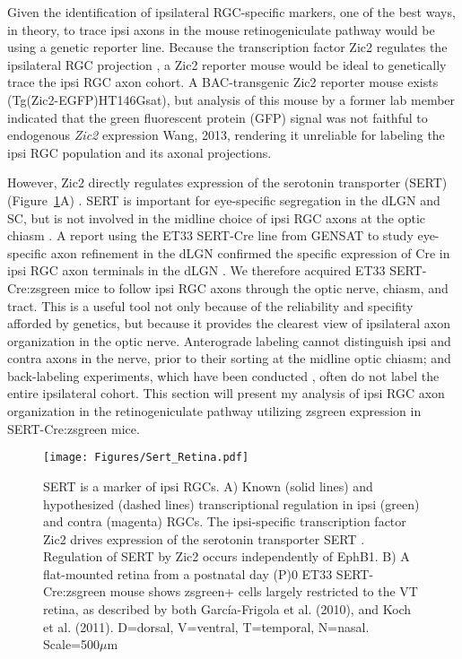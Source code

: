 \label{sec:SertCreResults}
Given the identification of ipsilateral RGC-specific markers, one of the best ways, in theory, to trace ipsi axons in the mouse retinogeniculate pathway would be using a genetic reporter line.
Because the transcription factor Zic2 regulates the ipsilateral RGC projection \cite{herrera2003zic2,williams2003ephrin}, a Zic2 reporter mouse would be ideal to genetically trace the ipsi RGC axon cohort.
A BAC-transgenic Zic2 reporter mouse exists (Tg(Zic2-EGFP)HT146Gsat), but analysis of this mouse by a former lab member indicated that the green fluorescent protein (GFP) signal was not faithful to endogenous \emph{Zic2} expression {Wang, 2013}, rendering it unreliable for labeling the ipsi RGC population and its axonal projections.

However, Zic2 directly regulates expression of the serotonin transporter (SERT) (Figure~\ref{Figures/Sert_Retina}A) \cite{garcia2010zic2}.
SERT is important for eye-specific segregation in the dLGN and SC, but is not involved in the midline choice of ipsi RGC axons at the optic chiasm \cite{salichon2001excessive,upton1999excess,garcia2010zic2}.
A report using the ET33 SERT-Cre line from GENSAT to study eye-specific axon refinement in the dLGN confirmed the specific expression of Cre in ipsi RGC axon terminals in the dLGN \cite{koch2011pathway}.
We therefore acquired ET33 SERT-Cre:zsgreen mice to follow ipsi RGC axons through the optic nerve, chiasm, and tract.
This is a useful tool not only because of the reliability and specifity afforded by genetics, but because it provides the clearest view of ipsilateral axon organization in the optic nerve.
Anterograde labeling cannot distinguish ipsi and contra axons in the nerve, prior to their sorting at the midline optic chiasm; and back-labeling experiments, which have been conducted \cite{colello1990early}, often do not label the entire ipsilateral cohort.
This section will present my analysis of ipsi RGC axon organization in the retinogeniculate pathway utilizing zsgreen expression in SERT-Cre:zsgreen mice.

\begin{figure}[hbtp]
	\begin{center}
		\texttt{[image: Figures/Sert\_Retina.pdf]}
		\caption[SERT is a marker of ipsi RGCs.]
		{
		SERT is a marker of ipsi RGCs. 
		A) Known (solid lines) and hypothesized (dashed lines) transcriptional regulation in ipsi (green) and contra (magenta) RGCs.
		The ipsi-specific transcription factor Zic2 drives expression of the serotonin transporter SERT \cite{garcia2010zic2}.
		Regulation of SERT by Zic2 occurs independently of EphB1.
		B) A flat-mounted retina from a postnatal day (P)0 ET33 SERT-Cre:zsgreen mouse shows zsgreen+ cells largely restricted to the VT retina, as described by both Garc\'ia-Frigola et al. (2010), and Koch et al. (2011). 
		D=dorsal, V=ventral, T=temporal, N=nasal. 
		Scale=500$\mu$m
		}
		\label{Figures/Sert_Retina}
	\end{center}
\end{figure}


